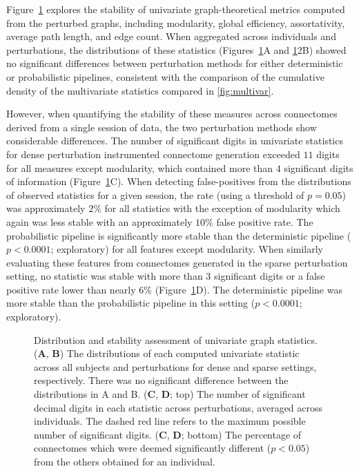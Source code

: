 \documentclass[10pt,letterpaper]{article}
\begin{document}
Figure~\ref{sfig:univariate} explores the stability of univariate graph-theoretical
metrics computed from the perturbed graphs, including modularity, global efficiency,
assortativity, average path length, and edge count. When aggregated across
individuals and perturbations, the distributions of these statistics
(Figures~\ref{sfig:univariate}A and \ref{sfig:univariate}2B) showed no significant
differences between perturbation methods for either deterministic or probabilistic
pipelines, consistent with the comparison of the cumulative density of the
multivariate statistics compared in \ref{fig:multivar}.

However, when quantifying the stability of these measures across connectomes derived
from a single session of data, the two perturbation methods show considerable
differences. The number of significant digits in univariate statistics for dense
perturbation instrumented connectome generation exceeded $11$ digits for all measures 
except modularity, which contained more than $4$ significant digits of information
(Figure~\ref{sfig:univariate}C). When detecting false-positives from the
distributions of observed statistics for a given session, the rate (using a
threshold of $p = 0.05$) was approximately $2\%$ for all statistics with the
exception of modularity which again was less stable with an approximately $10\%$
false positive rate. The probabilistic pipeline is significantly more stable than the
deterministic pipeline ($p < 0.0001$; exploratory) for all features except modularity.
When similarly evaluating these features from connectomes generated in the sparse
perturbation setting, no statistic was stable with more than $3$ significant digits
or a false positive rate lower than nearly $6\%$ (Figure~\ref{sfig:univariate}D).
The deterministic pipeline was more stable than the probabilistic pipeline in this
setting ($p < 0.0001$; exploratory).

\begin{figure}[bhtp!]\centering
\caption{Distribution and stability assessment of univariate graph statistics.
(\textbf{A}, \textbf{B}) The distributions of each computed univariate statistic
across all subjects and perturbations for dense and sparse settings, respectively.
There was no significant difference between the distributions in A and B. (\textbf{C},
\textbf{D}; top) The number of significant decimal digits in each statistic across
perturbations, averaged across individuals. The dashed red line refers to the
maximum possible number of significant digits. (\textbf{C}, \textbf{D}; bottom) The
percentage of connectomes which were deemed significantly different ($p < 0.05$)
from the others obtained for an individual.}
\label{sfig:univariate}
\end{figure}
\end{document}
